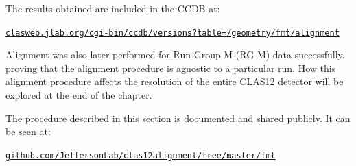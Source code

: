     The results obtained are included in the CCDB at:

    \small\href{https://clasweb.jlab.org/cgi-bin/ccdb/versions?table=/geometry/fmt/alignment}{\texttt{clasweb.jlab.org/cgi-bin/ccdb/versions?table=/geometry/fmt/alignment}}

    Alignment was also later performed for Run Group M (RG-M) data successfully, proving that the alignment procedure is agnostic to a particular run.
    How this alignment procedure affects the resolution of the entire CLAS12 detector will be explored at the end of the chapter.

    The procedure described in this section is documented and shared publicly.
    It can be seen at:

    \href{https://github.com/JeffersonLab/clas12alignment/tree/master/fmt}{\texttt{github.com/JeffersonLab/clas12alignment/tree/master/fmt}}
